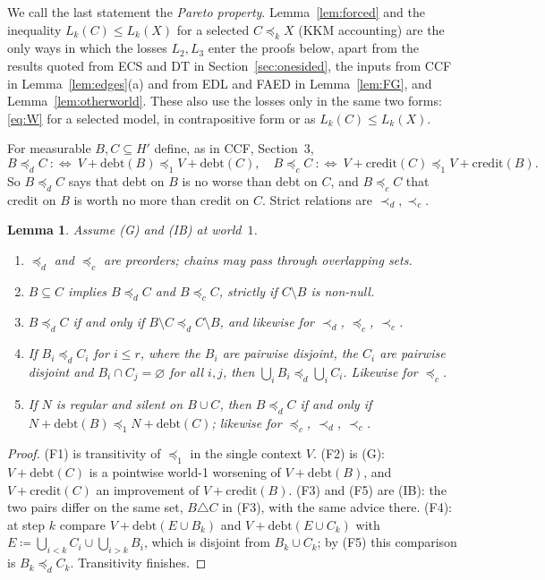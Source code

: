 \documentclass[11pt]{article}
\newtheorem{lemma}[theorem]{Lemma}
\theoremstyle{definition}\newtheorem{definition}[theorem]{Definition}
\theoremstyle{remark}\newtheorem{remark}[theorem]{Remark}
\newcommand{\debt}{\mathrm{debt}}
\newcommand{\cred}{\mathrm{credit}}
\begin{document}
We call the last statement the \emph{Pareto property}. Lemma~\ref{lem:forced}
and the inequality $L_k(C)\le L_k(X)$ for a selected $C\preceq_kX$ (KKM
accounting) are the only ways in which the losses $L_2,L_3$ enter the proofs
below, apart from the results quoted from ECS and DT in
Section~\ref{sec:onesided}, the inputs from CCF in
Lemma~\ref{lem:edges}(a) and from EDL and FAED in Lemma~\ref{lem:FG}, and
Lemma~\ref{lem:otherworld}. These also use the losses only in the same two
forms: \eqref{eq:W} for a selected model, in contrapositive form or as
$L_k(C)\le L_k(X)$.

For measurable $B,C\subseteq H'$ define, as in CCF, Section~3,
\[
 B\preceq_dC\ :\Longleftrightarrow\ V+\debt(B)\preceq_1V+\debt(C),\quad
 B\preceq_cC\ :\Longleftrightarrow\ V+\cred(C)\preceq_1V+\cred(B).
\]
So $B\preceq_dC$ says that debt on $B$ is no worse than debt on $C$, and
$B\preceq_cC$ that credit on $B$ is worth no more than credit on $C$. Strict
relations are $\prec_d,\prec_c$.

\begin{lemma}\label{lem:F}
Assume (G) and (IB) at world~$1$.
\begin{enumerate}[label=(F\arabic*),leftmargin=*,itemsep=1pt]
\item $\preceq_d$ and $\preceq_c$ are preorders; chains may pass through
overlapping sets.
\item $B\subseteq C$ implies $B\preceq_dC$ and $B\preceq_cC$, strictly if
$C\setminus B$ is non-null.
\item $B\preceq_dC$ if and only if $B\setminus C\preceq_dC\setminus B$, and
likewise for $\prec_d$, $\preceq_c$, $\prec_c$.
\item If $B_i\preceq_dC_i$ for $i\le r$, where the $B_i$ are pairwise
disjoint, the $C_i$ are pairwise disjoint and $B_i\cap C_j=\varnothing$ for
all $i,j$, then $\bigcup_iB_i\preceq_d\bigcup_iC_i$. Likewise for
$\preceq_c$.
\item If $N$ is regular and silent on $B\cup C$, then $B\preceq_dC$ if and
only if $N+\debt(B)\preceq_1N+\debt(C)$; likewise for $\preceq_c$, $\prec_d$,
$\prec_c$.
\end{enumerate}
\end{lemma}
\begin{proof}
(F1) is transitivity of $\preceq_1$ in the single context $V$. (F2) is (G):
$V+\debt(C)$ is a pointwise world-1 worsening of $V+\debt(B)$, and
$V+\cred(C)$ an improvement of $V+\cred(B)$. (F3) and (F5) are (IB): the two
pairs differ on the same set, $B\triangle C$ in (F3), with the same advice
there. (F4): at step $k$ compare $V+\debt(E\cup B_k)$ and
$V+\debt(E\cup C_k)$ with
$E\coloneqq\bigcup_{i<k}C_i\cup\bigcup_{i>k}B_i$, which is disjoint from
$B_k\cup C_k$; by (F5) this comparison is $B_k\preceq_dC_k$. Transitivity
finishes.
\end{proof}
\end{document}
